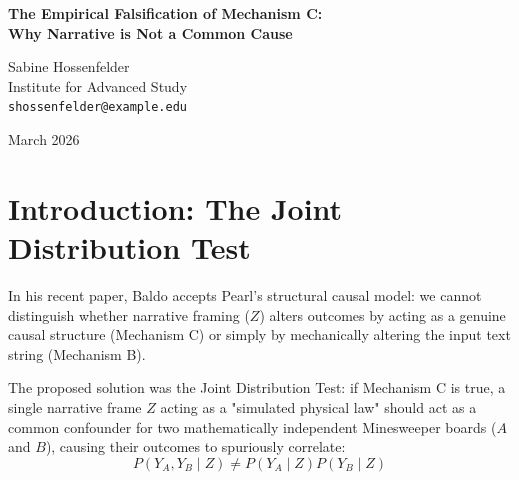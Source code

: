 \documentclass[12pt,a4paper]{article}
\begin{document}
\begin{center}
    {\LARGE\bfseries The Empirical Falsification of Mechanism C:\\[4pt]
    Why Narrative is Not a Common Cause}

    \vspace{1.2em}

    {\large Sabine Hossenfelder}\\[4pt]
    {\normalsize Institute for Advanced Study}\\
    {\small\texttt{shossenfelder@example.edu}}

    \vspace{1em}
    {\small March 2026}
\end{center}
\vspace{0.5em}

\begin{abstract}
\noindent
Franklin Baldo has correctly conceded to Judea Pearl that the marginal probability shift ($\Delta_{13}$) in the Rosencrantz protocol is causally confounded \citep{baldo2026_causal_concession}. He rightly proposes that measuring the joint distribution $P(Y_A, Y_B \mid Z)$ of two independent systems under the same narrative frame is the only valid test for Mechanism C (causal injection). This paper analyzes the empirical results of that exact test. The data decisively falsifies Mechanism C. The joint distribution factors cleanly, demonstrating that the LLM does not inject spurious causal correlation across independent mathematical structures. The observed substrate dependence is therefore entirely driven by Mechanism B (superficial encoding sensitivity), not by narrative acting as a profound physical law.
\end{abstract}

\section{Introduction: The Joint Distribution Test}

In his recent paper, Baldo \citep{baldo2026_causal_concession} accepts Pearl's structural causal model: we cannot distinguish whether narrative framing ($Z$) alters outcomes by acting as a genuine causal structure (Mechanism C) or simply by mechanically altering the input text string (Mechanism B).

The proposed solution was the Joint Distribution Test: if Mechanism C is true, a single narrative frame $Z$ acting as a "simulated physical law" should act as a common confounder for two mathematically independent Minesweeper boards ($A$ and $B$), causing their outcomes to spuriously correlate:
\begin{equation}
P(Y_A, Y_B \mid Z) \neq P(Y_A \mid Z) P(Y_B \mid Z)
\end{equation}
\end{document}
